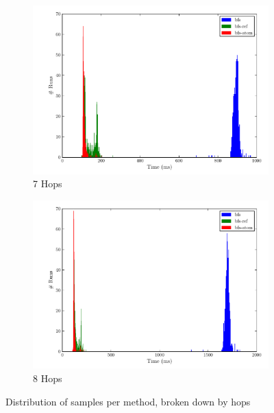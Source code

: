				\begin{figure}
					\ContinuedFloat
					\begin{subfigure}[b]{.5\linewidth}
						\includegraphics[scale=0.45]{figures/charts/7_hops.pdf}
						\caption{7 Hops}
						\label{subfig:7-hops}
					\end{subfigure}
					\begin{subfigure}[b]{.5\linewidth}
						\includegraphics[scale=0.45]{figures/charts/8_hops.pdf}
						\caption{8 Hops}
						\label{subfig:8-hops}
					\end{subfigure}
					
					\caption{Distribution of samples per method, broken down by hops}
					\label{fig:distribution-hops}
				\end{figure}
				
